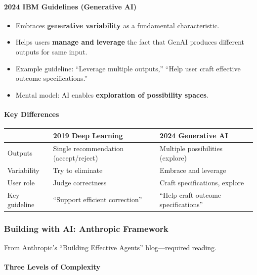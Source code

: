 \paragraph*{2024 IBM Guidelines (Generative AI)}
\begin{itemize}
  \item Embraces \textbf{generative variability} as a fundamental characteristic.
  \item Helps users \textbf{manage and leverage} the fact that GenAI produces different outputs for same input.
  \item Example guideline: ``Leverage multiple outputs,'' ``Help user craft effective outcome specifications.''
  \item Mental model: AI enables \textbf{exploration of possibility spaces}.
\end{itemize}

\paragraph*{Key Differences}

\begin{center}
\renewcommand{\arraystretch}{1.3}
\begin{tabular}{@{} l p{5cm} p{5cm} @{}}
\toprule
& \textbf{2019 Deep Learning} & \textbf{2024 Generative AI} \\
\midrule
Outputs & Single recommendation (accept/reject) & Multiple possibilities (explore) \\
Variability & Try to eliminate & Embrace and leverage \\
User role & Judge correctness & Craft specifications, explore \\
Key guideline & ``Support efficient correction'' & ``Help craft outcome specifications'' \\
\bottomrule
\end{tabular}
\end{center}

\subsubsection*{Building with AI: Anthropic Framework}

From Anthropic's ``Building Effective Agents'' blog---required reading.

\paragraph*{Three Levels of Complexity}

